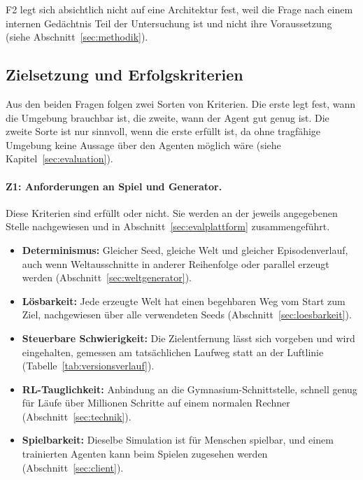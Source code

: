 \documentclass[11pt,a4paper]{article}
\begin{document}
\noindent
F2 legt sich absichtlich nicht auf eine Architektur fest, weil die Frage nach
einem internen Gedächtnis Teil der Untersuchung ist und nicht ihre
Voraussetzung (siehe Abschnitt~\ref{sec:methodik}).

\subsection{Zielsetzung und Erfolgskriterien}
\label{sec:ziele}

Aus den beiden Fragen folgen zwei Sorten von Kriterien. Die erste legt fest,
wann die Umgebung brauchbar ist, die zweite, wann der Agent gut genug ist. Die
zweite Sorte ist nur sinnvoll, wenn die erste erfüllt ist, da ohne tragfähige
Umgebung keine Aussage über den Agenten möglich wäre (siehe
Kapitel~\ref{sec:evaluation}).

\paragraph{Z1: Anforderungen an Spiel und Generator.}
Diese Kriterien sind erfüllt oder nicht. Sie werden an der jeweils angegebenen
Stelle nachgewiesen und in Abschnitt~\ref{sec:evalplattform} zusammengeführt.

\begin{itemize}
  \item \textbf{Determinismus:} Gleicher Seed, gleiche Welt und gleicher
        Episodenverlauf, auch wenn Weltausschnitte in anderer Reihenfolge
        oder parallel erzeugt werden (Abschnitt~\ref{sec:weltgenerator}).
  \item \textbf{Lösbarkeit:} Jede erzeugte Welt hat einen begehbaren Weg vom
        Start zum Ziel, nachgewiesen über alle verwendeten Seeds
        (Abschnitt~\ref{sec:loesbarkeit}).
  \item \textbf{Steuerbare Schwierigkeit:} Die Zielentfernung lässt sich
        vorgeben und wird eingehalten, gemessen am tatsächlichen Laufweg statt
        an der Luftlinie (Tabelle~\ref{tab:versionsverlauf}).
  \item \textbf{RL-Tauglichkeit:} Anbindung an die Gymnasium-Schnittstelle,
        schnell genug für Läufe über Millionen Schritte auf einem normalen
        Rechner (Abschnitt~\ref{sec:technik}).
  \item \textbf{Spielbarkeit:} Dieselbe Simulation ist für Menschen spielbar,
        und einem trainierten Agenten kann beim Spielen zugesehen werden
        (Abschnitt~\ref{sec:client}).
\end{itemize}
\end{document}
